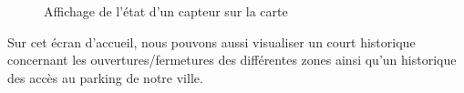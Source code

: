 \begin{figure}[H]
    \begin{center}
        \caption{Affichage de l'état d'un capteur sur la carte}
    \end{center}
\end{figure}

Sur cet écran d’accueil, nous pouvons aussi visualiser un court historique concernant les ouvertures/fermetures des différentes zones ainsi qu’un historique des accès au parking de notre ville. 

